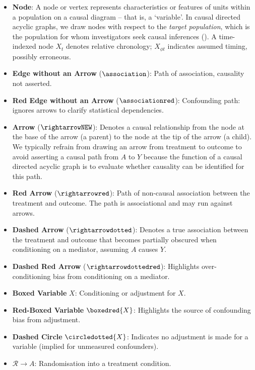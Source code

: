 \documentclass[
  single column]{article}
\begin{document}
\begin{itemize}
\item
  \textbf{Node}: A node or vertex represents characteristics or features
  of units within a population on a causal diagram -- that is, a
  `variable'. In causal directed acyclic graphs, we draw nodes with
  respect to the \emph{target population}, which is the population for
  whom investigators seek causal inferences
  (). A time-indexed node
  \(X_t\) denotes relative chronology; \(X_{\phi t}\) indicates assumed
  timing, possibly erroneous.
\item
  \textbf{Edge without an Arrow} (\(\association\)): Path of
  association, causality not asserted.
\item
  \textbf{Red Edge without an Arrow} (\(\associationred\)): Confounding
  path: ignores arrows to clarify statistical dependencies.
\item
  \textbf{Arrow} (\(\rightarrowNEW\)): Denotes a causal relationship
  from the node at the base of the arrow (a parent) to the node at the
  tip of the arrow (a child). We typically refrain from drawing an arrow
  from treatment to outcome to avoid asserting a causal path from \(A\)
  to \(Y\) because the function of a causal directed acyclic graph is to
  evaluate whether causality can be identified for this path.
\item
  \textbf{Red Arrow} (\(\rightarrowred\)): Path of non-causal
  association between the treatment and outcome. The path is
  associational and may run against arrows.
\item
  \textbf{Dashed Arrow} (\(\rightarrowdotted\)): Denotes a true
  association between the treatment and outcome that becomes partially
  obscured when conditioning on a mediator, assuming \(A\) causes \(Y\).
\item
  \textbf{Dashed Red Arrow} (\(\rightarrowdottedred\)): Highlights
  over-conditioning bias from conditioning on a mediator.
\item
  \textbf{Boxed Variable} \(\boxed{X}\): Conditioning or adjustment for
  \(X\).
\item
  \textbf{Red-Boxed Variable} \(\boxedred{X}\): Highlights the source of
  confounding bias from adjustment.
\item
  \textbf{Dashed Circle} \(\circledotted{X}\): Indicates no adjustment
  is made for a variable (implied for unmeasured confounders).
\item
  \textbf{\(\mathcal{R} \rightarrow A\)}: Randomisation into a treatment
  condition.
\end{itemize}
\end{document}
